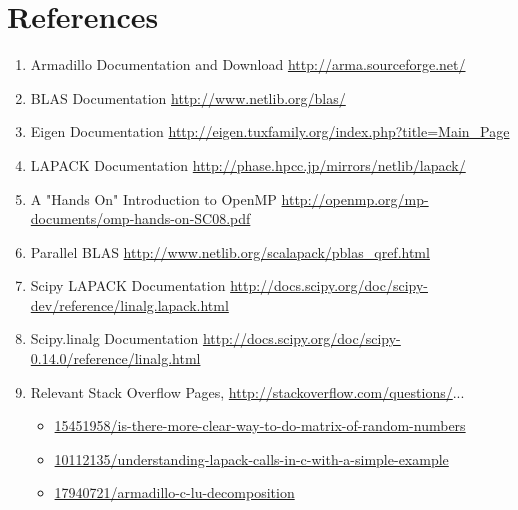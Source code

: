 \chapter*{References}

\begin{enumerate}
\item Armadillo Documentation and Download \url{http://arma.sourceforge.net/}
\item BLAS Documentation \url{http://www.netlib.org/blas/}
\item Eigen Documentation \url{http://eigen.tuxfamily.org/index.php?title=Main_Page}
\item LAPACK Documentation \url{http://phase.hpcc.jp/mirrors/netlib/lapack/}
\item A "Hands On" Introduction to OpenMP \url{http://openmp.org/mp-documents/omp-hands-on-SC08.pdf}
\item Parallel BLAS \url{http://www.netlib.org/scalapack/pblas_qref.html}
\item Scipy LAPACK Documentation \url{http://docs.scipy.org/doc/scipy-dev/reference/linalg.lapack.html}
\item Scipy.linalg Documentation \url{http://docs.scipy.org/doc/scipy-0.14.0/reference/linalg.html}
\item Relevant Stack Overflow Pages, \url{http://stackoverflow.com/questions/}...
\begin{itemize}
\item \url{15451958/is-there-more-clear-way-to-do-matrix-of-random-numbers}
\item \url{10112135/understanding-lapack-calls-in-c-with-a-simple-example}
\item \url{17940721/armadillo-c-lu-decomposition}
\end{itemize}
\end{enumerate}